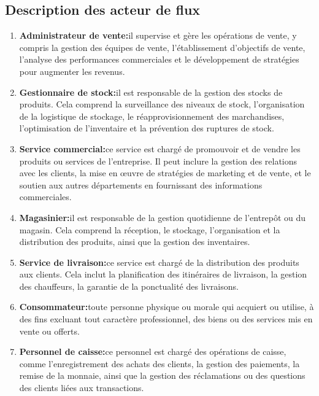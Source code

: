 \documentclass[edit,12pt,a4paper,ChapStyle,oneside,doubleinterligne]{report}
\begin{document}
\subsection{Description des acteur de flux}
\begin{enumerate}
    \item\textbf{Administrateur de vente:}il supervise et gère les opérations de vente, y compris la gestion des équipes de vente, l'établissement d'objectifs de vente, l'analyse des performances commerciales et le développement de stratégies pour augmenter les revenus.\cite{Administrateur}
    \item\textbf{Gestionnaire de stock:}il est responsable de la gestion des stocks de produits. Cela comprend la surveillance des niveaux de stock, l'organisation de la logistique de stockage, le réapprovisionnement des marchandises, l'optimisation de l'inventaire et la prévention des ruptures de stock.
    \cite{Gestionnaire}
    \item\textbf{Service commercial:}ce service est chargé de promouvoir et de vendre les produits ou services de l'entreprise. Il peut inclure la gestion des relations avec les clients, la mise en œuvre de stratégies de marketing et de vente, et le soutien aux autres départements en fournissant des informations commerciales.
    \cite{Service}
    \item\textbf{Magasinier:}il est responsable de la gestion quotidienne de l'entrepôt ou du magasin. Cela comprend la réception, le stockage, l'organisation et la distribution des produits, ainsi que la gestion des inventaires.
    \cite{Magasinier}
    \item\textbf{Service de livraison:}ce service est chargé de la distribution des produits aux clients. Cela inclut la planification des itinéraires de livraison, la gestion des chauffeurs, la garantie de la ponctualité des livraisons.
    \cite{logistique}
    \item\textbf{Consommateur:}toute personne physique ou morale qui acquiert ou utilise, à des fins excluant tout caractère professionnel, des biens ou des services mis en vente ou offerts.\cite{Consommateur}
    \item \textbf{Personnel de caisse:}ce personnel est chargé des opérations de caisse, comme l'enregistrement des achats des clients, la gestion des paiements, la remise de la monnaie, ainsi que la gestion des réclamations ou des questions des clients liées aux transactions.
    \cite{Personnel}
\end{enumerate}
\end{document}
